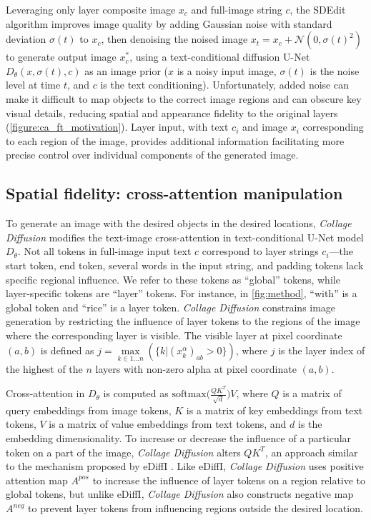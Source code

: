 Leveraging only layer composite image $x_c$ and full-image string $c$, the SDEdit algorithm \cite{sdedit} improves image quality by adding Gaussian noise with standard deviation $\sigma(t)$ to $x_c$, then denoising the noised image $x_t = x_c + \mathcal{N}(0,\sigma(t)^2)$ to generate output image $x^*_c$, using a text-conditional diffusion U-Net $D_\theta(x,\sigma(t),c)$ as an image prior \cite{latentDiffusion} ($x$ is a noisy input image, $\sigma(t)$ is the noise level at time $t$, and $c$ is the text conditioning).
Unfortunately, added noise can make it difficult to map objects to the correct image regions and can obscure key visual details, reducing spatial and appearance fidelity to the original layers (\cref{figure:ca_ft_motivation}). 
Layer input, with text $c_i$ and image $x_i$ corresponding to each region of the image, provides additional information facilitating more precise control over individual components of the generated image. 

\subsection{Spatial fidelity: cross-attention manipulation} \label{method:CAC}
\vspace{-0.5em}

To generate an image with the desired objects in the desired locations, 
\textit{Collage Diffusion} modifies the text-image cross-attention 
in text-conditional U-Net model $D_\theta$. 
Not all tokens in full-image input text $c$ correspond to layer strings $c_i$---the start token, end token, several words in the input string, and padding tokens lack specific regional influence. 
We refer to these tokens as ``global'' tokens, while layer-specific tokens are ``layer'' tokens. 
For instance, in \cref{fig:method}, ``with'' is a global token and ``rice'' is a layer token. 
\textit{Collage Diffusion} constrains image generation by restricting the influence of layer tokens to the regions of the image where the corresponding layer is visible.%
The visible layer at pixel coordinate $(a,b)$ is defined as $j = \max\limits_{k \in 1 \dots n}(\{k | (x^\alpha_{k})_{ab} > 0\})$, where $j$ is the layer index of the highest of the $n$ layers with non-zero alpha at pixel coordinate $(a,b)$. 

Cross-attention in $D_\theta$ is computed as $\mathrm{softmax}\big(\frac{QK^T}{\sqrt{d}}\big)V$, where $Q$ is a matrix of query embeddings from image tokens, $K$ is a matrix of key embeddings from text tokens, $V$ is a matrix of value embeddings from text tokens, and $d$ is the embedding dimensionality.
To increase or decrease the influence of a particular token on a part of the image, \textit{Collage Diffusion} alters $QK^T$, an approach similar to the mechanism proposed by eDiffI \cite{ediffi}. 
Like eDiffI, \textit{Collage Diffusion} uses positive attention map $A^{pos}$ to increase the influence of layer tokens on a region relative to global tokens, but unlike eDiffI, \textit{Collage Diffusion} also constructs negative map $A^{neg}$ to prevent layer tokens from influencing regions outside the desired location.

